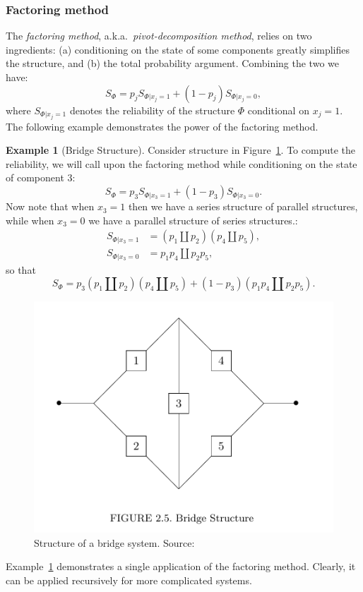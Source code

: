 \documentclass[12pt,a4paper]{report}
\theoremstyle{plain}
\theoremstyle{definition}
\newtheorem{example}{Example}
\newcommand{\aka}{{a.k.a.\ }}
\newcommand{\struct}{\Phi}
\begin{document}
\subsubsection{Factoring method}
The \emph{factoring method}, \aka \emph{pivot-decomposition method}, relies on two ingredients: 
(a) conditioning on the state of some components greatly simplifies the structure, and
(b) the total probability argument.
Combining the two we have:
$$ S_\struct= p_j  S_{\struct|x_j=1} + (1-p_j) S_{\struct|x_j=0}   ,$$
where $S_{\struct|x_j=1}$ denotes the reliability of the structure $\Phi$ conditional on $x_j=1$.
The following example demonstrates the power of the factoring method.

\begin{example}[Bridge Structure]
\label{eg:bridge}
Consider structure in Figure~\ref{fig:bridge}.
To compute the reliability, we will call upon the factoring method while conditioning on the state of component $3$:
$$ S_\struct= p_3  S_{\struct|x_3=1} + (1-p_3) S_{\struct|x_3=0}   .$$
Now note that when $x_3=1$ then we have a series structure of parallel structures, while when $x_3=0$ we have a parallel structure of series structures.:
\begin{align*}
	S_{\struct|x_3=1} &= (p_1 \coprod p_2) (p_4 \coprod p_5),\\
	S_{\struct|x_3=0} &=  p_1 p_4 \coprod p_2 p_5,
\end{align*}
so that 
$$ 	
	S_\struct = p_3  (p_1 \coprod p_2) (p_4 \coprod p_5) + (1-p_3) (p_1 p_4 \coprod p_2 p_5).
$$
\begin{figure}[ht]
\centering
\includegraphics[width=0.5\linewidth]{art/bridge}
\caption{Structure of a bridge system. Source: \cite[Fig.2.5]{aven_stochastic_1999}}
\label{fig:bridge}
\end{figure}
\end{example}
Example~\ref{eg:bridge} demonstrates a single application of the factoring method. Clearly, it can be applied recursively for more complicated systems.
\end{document}
